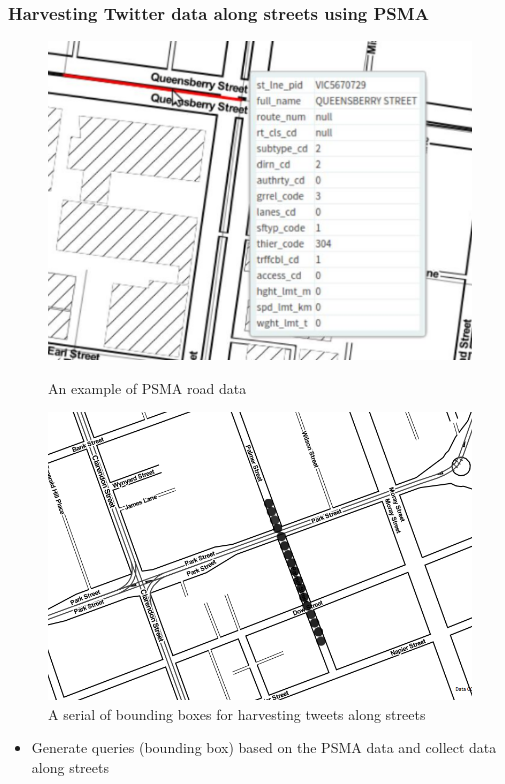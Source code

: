 \begin{frame}
    \frametitle{Harvesting Twitter data along streets using PSMA}

    \begin{figure}[h]
       \begin{minipage}{0.49\textwidth}
         \centering
         \includegraphics[width=.8\linewidth]{resource/figures/psma_data.png}
         \caption{An example of PSMA road data}\label{fig:psma}
       \end{minipage}\hfill
       \begin{minipage}{0.49\textwidth}
         \centering
         \includegraphics[width=.8\linewidth]{resource/figures/harvest_tweets_along_street.png}
         \caption{A serial of bounding boxes for harvesting tweets along streets}\label{fig:harvest_along_street}
       \end{minipage}
    \end{figure}

    \begin{itemize}
	    \item Generate queries (bounding box) based on the PSMA data and collect data along streets
    \end{itemize}
\end{frame}

